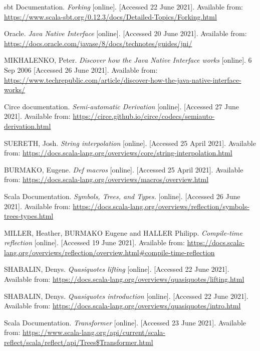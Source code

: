 \documentclass[thesis=B,english]{FITthesis}[2019/12/23]
\begin{document}
\begin{thebibliography}{9}
sbt Documentation.
\textit {Forking} [online]. [Accessed 22 June 2021]. Available from:
\url{https://www.scala-sbt.org/0.12.3/docs/Detailed-Topics/Forking.html}

Oracle.
\textit{Java Native Interface} [online]. [Accessed 20 June 2021]. Available from:
\url{https://docs.oracle.com/javase/8/docs/technotes/guides/jni/}

MIKHALENKO, Peter.
\textit{Discover how the Java Native Interface works} [online]. 6 Sep 2006  [Accessed 26 June 2021]. Available from:
\url{https://www.techrepublic.com/article/discover-how-the-java-native-interface-works/}

Circe documentation.
\textit{Semi-automatic Derivation}
[online]. [Accessed 27 June 2021]. Available from:
\url{https://circe.github.io/circe/codecs/semiauto-derivation.html}

SUERETH, Josh. 
\textit {String interpolation} [online]. [Accessed 25 April 2021]. Available from: \url{https://docs.scala-lang.org/overviews/core/string-interpolation.html}

BURMAKO, Eugene. 
\textit {Def macros} [online]. [Accessed 25 April 2021]. Available from: \url{https://docs.scala-lang.org/overviews/macros/overview.html}

Scala Documentation.
\textit{Symbols, Trees, and Types.} [online]. [Accessed 26 June 2021]. Available from: \url{https://docs.scala-lang.org/overviews/reflection/symbols-trees-types.html} 


MILLER, Heather, BURMAKO Eugene and HALLER Philipp.
\textit {Compile-time reflection} [online]. [Accessed 19 June 2021]. Available from: \url{https://docs.scala-lang.org/overviews/reflection/overview.html\#compile-time-reflection}

SHABALIN, Denys.
\textit {Quasiquotes lifting} [online]. [Accessed 22 June 2021]. Available from:
\url{https://docs.scala-lang.org/overviews/quasiquotes/lifting.html}

SHABALIN, Denys.
\textit {Quasiquotes introduction} [online]. [Accessed 22 June 2021]. Available from:
\url{https://docs.scala-lang.org/overviews/quasiquotes/intro.html}

Scala Documentation.
\textit {Transformer} [online]. [Accessed 23 June 2021]. Available from:
\url{https://www.scala-lang.org/api/current/scala-reflect/scala/reflect/api/Trees$Transformer.html}


\end{thebibliography}
\end{document}
